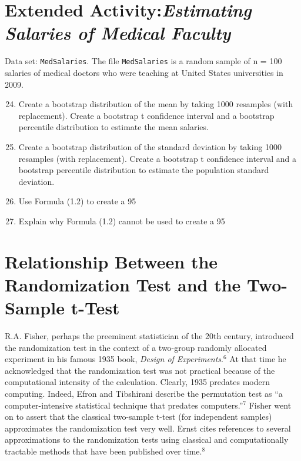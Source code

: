 \documentclass[
]{report}
\begin{document}
\hypertarget{extended-activityestimating-salaries-of-medical-faculty}{%
\section*{\texorpdfstring{Extended Activity:\emph{Estimating Salaries of Medical Faculty}}{Extended Activity:Estimating Salaries of Medical Faculty}}\label{extended-activityestimating-salaries-of-medical-faculty}}

Data set: \texttt{MedSalaries}.
The file \texttt{MedSalaries} is a random sample of n = 100 salaries of medical doctors who were teaching at United States universities in 2009.

\begin{enumerate}
  \setcounter{enumi}{23} 
  \item Create a bootstrap distribution of the mean by taking 1000 resamples (with replacement). Create a bootstrap t confidence interval and a bootstrap percentile distribution to estimate the mean salaries.
  \item Create a bootstrap distribution of the standard deviation by taking 1000 resamples (with replacement). Create a bootstrap t confidence interval and a bootstrap percentile distribution to estimate the population standard deviation.
  \item Use Formula (1.2) to create a 95%
  \item Explain why Formula (1.2) cannot be used to create a 95%
\end{enumerate}

\hypertarget{relationship-between-the-randomization-test-and-the-two-sample-t-test}{%
\section{\texorpdfstring{\textbf{Relationship Between the Randomization Test and the Two-Sample t-Test}}{Relationship Between the Randomization Test and the Two-Sample t-Test}}\label{relationship-between-the-randomization-test-and-the-two-sample-t-test}}

R.A. Fisher, perhaps the preeminent statistician of the 20th century, introduced the randomization test in the context of a two-group randomly allocated experiment in his famous 1935 book, \emph{Design of Experiments}.\(^6\) At that time he acknowledged that the randomization test was not practical because of the computational
intensity of the calculation. Clearly, 1935 predates modern computing. Indeed, Efron and Tibshirani describe the permutation test as ``a computer-intensive statistical technique that predates computers.''\(^7\) Fisher went on to assert that the classical two-sample t-test (for independent samples) approximates the randomization test very well. Ernst cites references to several approximations to the randomization tests using classical and computationally tractable methods that have been published over time.\(^8\)
\end{document}
